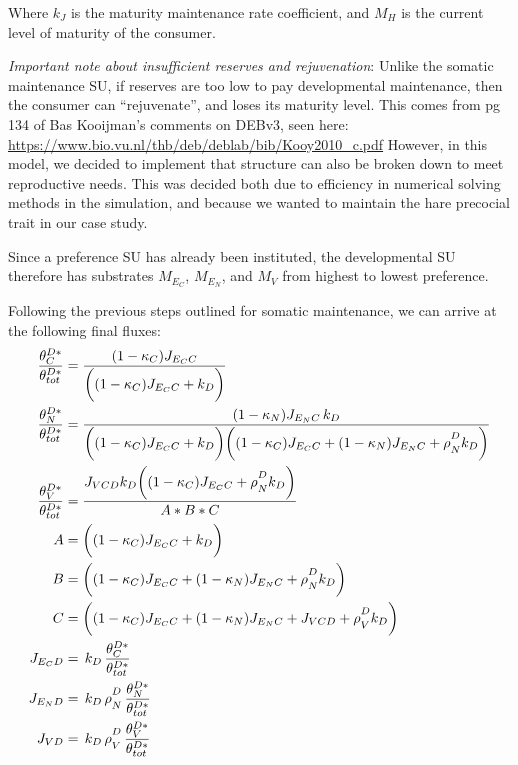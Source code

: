 \documentclass[
]{article}
\begin{document}
Where \(k_{\scriptscriptstyle J}\) is the maturity maintenance rate
coefficient, and \(M_H\) is the current level of maturity of the
consumer.

\emph{Important note about insufficient reserves and rejuvenation}:
Unlike the somatic maintenance SU, if reserves are too low to pay
developmental maintenance, then the consumer can ``rejuvenate'', and
loses its maturity level. This comes from pg 134 of Bas Kooijman's
comments on DEBv3, seen here:
\url{https://www.bio.vu.nl/thb/deb/deblab/bib/Kooy2010_c.pdf} However,
in this model, we decided to implement that structure can also be broken
down to meet reproductive needs. This was decided both due to efficiency
in numerical solving methods in the simulation, and because we wanted to
maintain the hare precocial trait in our case study.

Since a preference SU has already been instituted, the developmental SU
therefore has substrates \(M_{E_C}\), \(M_{E_N}\), and \(M_{V}\) from
highest to lowest preference.

Following the previous steps outlined for somatic maintenance, we can
arrive at the following final fluxes: \begin{align}
\frac{\theta^{D*}_C}{\theta^{D*}_{tot}} &= \frac{(1 - {\kappa_C}){J_{{E_C}C}}}{\biggl((1 - {\kappa_C}){J_{{E_C}C}} + {k_D}\biggr)}
\\
\frac{\theta^{D*}_N}{\theta^{D*}_{tot}}&= \frac{(1 - {\kappa_N}){J_{{E_N}C}}\,{k_D}}{\biggl((1 - {\kappa_C}){J_{{E_C}C}} + {k_D}\biggr)\biggl({(1 - {\kappa_C}){J_{{E_C}C}} + (1 - {\kappa_N}){J_{{E_N}C}} + {\rho\strut^D_N}{k_D}\biggr)}}
\\
\frac{\theta^{D*}_V}{\theta^{D*}_{tot}}&= \frac{{J_{VCD}}{k_D}\biggl((1 - {\kappa_C}){J_{{E_C}C}} + {\rho\strut^D_N}{k_D}\biggr)}{A * B * C}
\\\nonumber
A &= \biggl((1 - {\kappa_C}){J_{{E_C}C}} + {k_D}\biggr)
\\\nonumber
B &= \biggl((1 - {\kappa_C}){J_{{E_C}C}} + (1 - {\kappa_N}){J_{{E_N}C}} + {\rho\strut^D_N}{k_D}\biggr)
\\\nonumber
C &= \biggl((1 - {\kappa_C}){J_{{E_C}C}} + (1 - {\kappa_N}){J_{{E_N}C}} + {J_{VCD}} + {\rho\strut^D_V}{k_D}\biggr)
\\
J_{{E_C}D} &= \,k_D\,\frac{\theta^{D*}_C}{\theta^{D*}_{tot}} 
\\
J_{{E_N}D} &= \,k_D\,\rho\strut^D_N\,\frac{\theta^{D*}_N}{\theta^{D*}_{tot}}
\\
J_{VD} &= \,k_D\,\rho\strut^D_V\,\frac{\theta^{D*}_V}{\theta^{D*}_{tot}}
\end{align}
\end{document}
